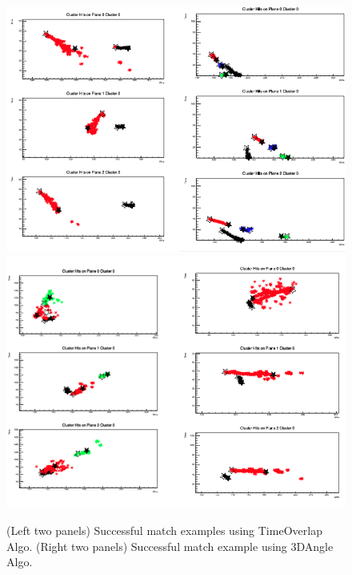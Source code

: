 \documentclass{article}
\begin{document}
\newpage

\begin{figure}[!h]
\begin{center}
\includegraphics[scale=0.25]{Figures/MatchAlgo_CFAlgoTimeOverlap_MatchExample.png}
\hspace{0.1 cm}
\includegraphics[scale=0.25]{Figures/MatchAlgo_CFAlgo3DAngle_MatchExample.png}
\end{center}
\caption{(Left two panels) Successful match examples using TimeOverlap Algo. (Right two panels) Successful match example using 3DAngle Algo. }
\label{fig:ex}
\end{figure}
\end{document}
